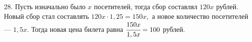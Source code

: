 28. Пусть изначально было $x$ посетителей, тогда сбор составлял $120x$ рублей. Новый сбор стал составлять $120x\cdot1,25=150x,$ а новое количество посетителей --- $1,5x.$ Тогда новая цена билета равна $\cfrac{150x}{1,5x}=100$ рублей.\\
